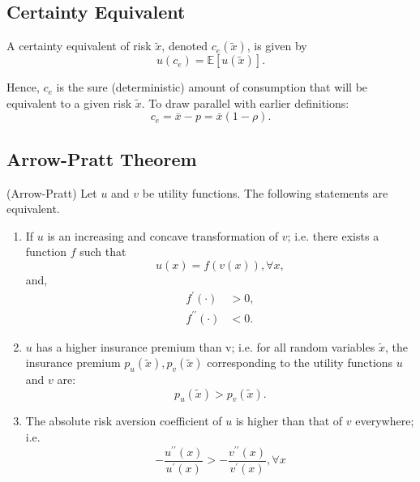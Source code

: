 \documentclass[10pt]{article}
\begin{document}
\subsection{Certainty Equivalent}

\begin{definition}
    
    A certainty equivalent of risk $\tilde{x}$, denoted $c_e(\tilde{x})$, is given by
    $$
    u\left(c_e\right)=\mathbb{E}[u(\tilde{x})] .
    $$

    Hence, $c_e$ is the sure (deterministic) amount of consumption that will be equivalent to a given risk $\tilde{x}$. 
    To draw parallel with earlier definitions:
    $$
    c_e=\bar{x}-p=\bar{x}(1-\rho) .
    $$
     
\end{definition}

\subsection{Arrow-Pratt Theorem}

\begin{theorem}
    (Arrow-Pratt) Let $u$ and $v$ be utility functions. The following statements are equivalent.
    
    \begin{enumerate}
        \item  If $u$ is an increasing and concave transformation of $v$; i.e. there exists a function $f$ such that
        $$
        u(x)=f(v(x)), \forall x,
        $$
        and,
        $$
        \begin{aligned}
        f^{\prime}(\cdot) & >0, \\
        f^{\prime \prime}(\cdot) & <0 .
        \end{aligned}
        $$
        \item $u$ has a higher insurance premium than v; i.e. for all random variables $\tilde{x}$, the insurance premium $p_u(\tilde{x}), p_v(\tilde{x})$ corresponding to the utility functions $u$ and $v$ are:
        $$
        p_u(\tilde{x})>p_v(\tilde{x}) .
        $$
        \item The absolute risk aversion coefficient of $u$ is higher than that of $v$ everywhere; i.e.
        $$
        -\frac{u^{\prime \prime}(x)}{u^{\prime}(x)}>-\frac{v^{\prime \prime}(x)}{v^{\prime}(x)}, \forall x
        $$
    \end{enumerate}

\end{theorem}
\end{document}
